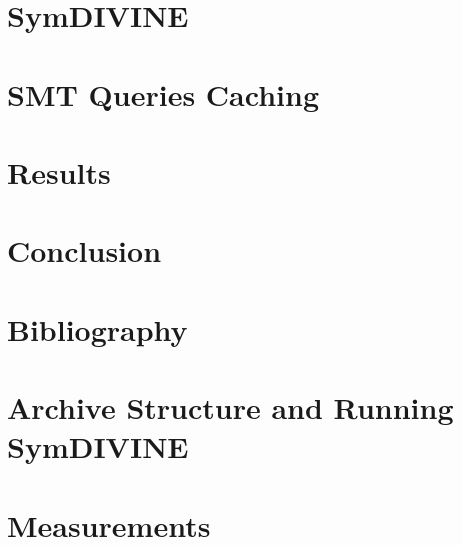 \documentclass[11pt,twoside,a4paper]{book}
\newcommand{\symdivine}{\mbox{\textsf{SymDIVINE}}\xspace}
\newcommand{\smt}{\mbox{SMT}\xspace}
\begin{document}
\chapter{\symdivine} \label{chap:symdivine}


\chapter{\smt Queries Caching} \label{chap:caching}


\chapter{Results} \label{chap:results}


\chapter{Conclusion} \label{chap:conclusion}


\chapter*{Bibliography}
\markboth{}{} %
\printbibliography[heading=none]

\appendix
\chapter{Archive Structure and Running \symdivine} \label{chap:appendix}


\chapter{Measurements} \label{chap:appendix_b}


%
\end{document}
